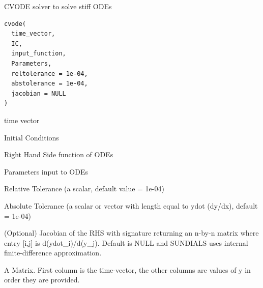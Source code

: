 \documentclass[letterpaper]{book}
\begin{document}
%
\begin{Description}
CVODE solver to solve stiff ODEs
\end{Description}
%
\begin{Usage}
\begin{verbatim}
cvode(
  time_vector,
  IC,
  input_function,
  Parameters,
  reltolerance = 1e-04,
  abstolerance = 1e-04,
  jacobian = NULL
)
\end{verbatim}
\end{Usage}
%
\begin{Arguments}
\begin{ldescription}
\item[\code{time\_vector}] time vector

\item[\code{IC}] Initial Conditions

\item[\code{input\_function}] Right Hand Side function of ODEs

\item[\code{Parameters}] Parameters input to ODEs

\item[\code{reltolerance}] Relative Tolerance (a scalar, default value  = 1e-04)

\item[\code{abstolerance}] Absolute Tolerance (a scalar or vector with length equal to ydot (dy/dx), default = 1e-04)

\item[\code{jacobian}] (Optional) Jacobian of the RHS with signature  returning an n-by-n matrix where entry [i,j] is d(ydot\_i)/d(y\_j). Default is NULL and SUNDIALS uses internal finite-difference approximation.
\end{ldescription}
\end{Arguments}
%
\begin{Value}
A Matrix. First column is the time-vector, the other columns are values of y in order they are provided.
\end{Value}
%
\end{document}
